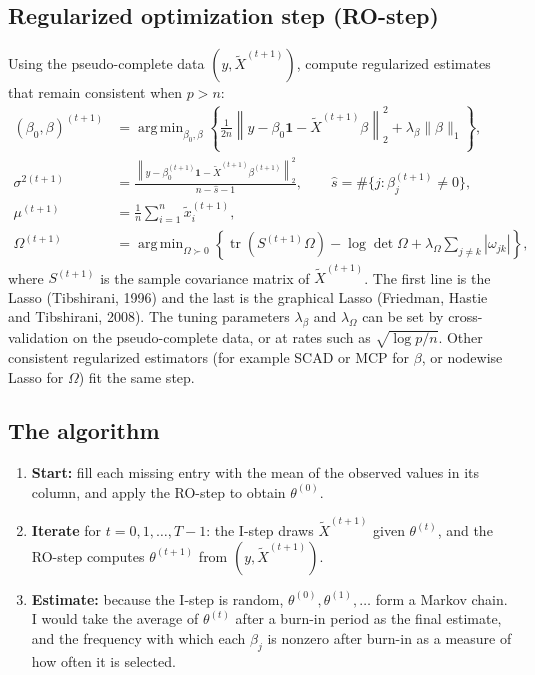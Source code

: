 \documentclass[11pt]{article}
\DeclareMathOperator*{\argmin}{arg\,min}
\begin{document}
\subsection*{Regularized optimization step (RO-step)}

Using the pseudo-complete data $(y,\tilde X^{(t+1)})$, compute regularized estimates that remain consistent when
$p>n$:
\begin{align*}
(\beta_0,\beta)^{(t+1)}&=\argmin_{\beta_0,\beta}\left\{\frac{1}{2n}\left\|y-\beta_0\mathbf 1-\tilde X^{(t+1)}\beta\right\|_2^2
+\lambda_\beta\|\beta\|_1\right\},\\
\sigma^{2(t+1)}&=\frac{\left\|y-\beta_0^{(t+1)}\mathbf 1-\tilde X^{(t+1)}\beta^{(t+1)}\right\|_2^2}{n-\hat s-1},
\qquad \hat s=\#\{j:\beta_j^{(t+1)}\ne0\},\\
\mu^{(t+1)}&=\frac1n\sum_{i=1}^n\tilde x_i^{(t+1)},\\
\Omega^{(t+1)}&=\argmin_{\Omega\succ0}\left\{\operatorname{tr}\!\left(S^{(t+1)}\Omega\right)-\log\det\Omega
+\lambda_\Omega\sum_{j\ne k}|\omega_{jk}|\right\},
\end{align*}
where $S^{(t+1)}$ is the sample covariance matrix of $\tilde X^{(t+1)}$. The first line is the Lasso
(Tibshirani, 1996) and the last is the graphical Lasso (Friedman, Hastie and Tibshirani, 2008). The tuning parameters $\lambda_\beta$ and
$\lambda_\Omega$ can be set by cross-validation on the pseudo-complete data, or at rates such as
$\sqrt{\log p/n}$. Other consistent regularized estimators (for example SCAD or MCP for $\beta$, or nodewise
Lasso for $\Omega$) fit the same step.

\subsection*{The algorithm}

\begin{enumerate}
\item \textbf{Start:} fill each missing entry with the mean of the observed values in its column, and apply the
RO-step to obtain $\theta^{(0)}$.
\item \textbf{Iterate} for $t=0,1,\ldots,T-1$: the I-step draws $\tilde X^{(t+1)}$ given $\theta^{(t)}$, and the
RO-step computes $\theta^{(t+1)}$ from $(y,\tilde X^{(t+1)})$.
\item \textbf{Estimate:} because the I-step is random, $\theta^{(0)},\theta^{(1)},\ldots$ form a Markov chain. I
would take the average of $\theta^{(t)}$ after a burn-in period as the final estimate, and the frequency with
which each $\beta_j$ is nonzero after burn-in as a measure of how often it is selected.
\end{enumerate}
\end{document}
